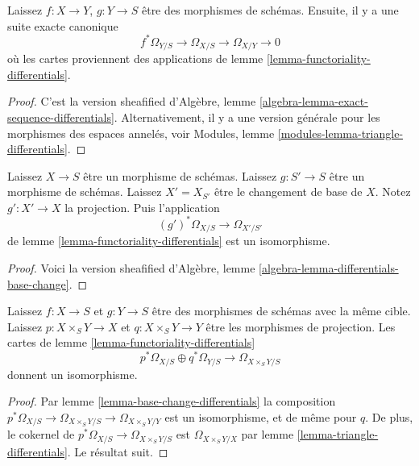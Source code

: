 \begin{lemma}

\label{lemma-triangle-differentials}
Laissez $f : X \to Y$, $g : Y \to S$ être des morphismes de schémas. Ensuite, il y a une suite exacte canonique $$
f^*\Omega_{Y/S} \to \Omega_{X/S} \to \Omega_{X/Y} \to 0
$$ où les cartes proviennent des applications de lemme \ref{lemma-functoriality-differentials}.
\end{lemma}

\begin{proof}
C'est la version sheafified d'Algèbre, lemme \ref{algebra-lemma-exact-sequence-differentials}. Alternativement, il y a une version générale pour les morphismes des espaces annelés, voir Modules, lemme \ref{modules-lemma-triangle-differentials}.
\end{proof}

\begin{lemma}

\label{lemma-base-change-differentials}
Laissez $X \to S$ être un morphisme de schémas. Laissez $g : S' \to S$ être un morphisme de schémas. Laissez $X' = X_{S'}$ être le changement de base de $X$. Notez $g' : X' \to X$ la projection. Puis l'application $$
(g')^*\Omega_{X/S} \to \Omega_{X'/S'}
$$ de lemme \ref{lemma-functoriality-differentials} est un isomorphisme.
\end{lemma}

\begin{proof}
Voici la version sheafified d'Algèbre, lemme \ref{algebra-lemma-differentials-base-change}.
\end{proof}

\begin{lemma}

\label{lemma-differential-product}
Laissez $f : X \to S$ et $g : Y \to S$ être des morphismes de schémas avec la même cible. Laissez $p : X \times_S Y \to X$ et $q : X \times_S Y \to Y$ être les morphismes de projection. Les cartes de lemme \ref{lemma-functoriality-differentials} $$
p^*\Omega_{X/S} \oplus q^*\Omega_{Y/S}
\longrightarrow
\Omega_{X \times_S Y/S}
$$ donnent un isomorphisme.
\end{lemma}

\begin{proof}
Par lemme \ref{lemma-base-change-differentials} la composition $p^*\Omega_{X/S} \to \Omega_{X \times_S Y/S} \to \Omega_{X \times_S Y/Y}$ est un isomorphisme, et de même pour $q$. De plus, le cokernel de $p^*\Omega_{X/S} \to \Omega_{X \times_S Y/S}$ est $\Omega_{X \times_S Y/X}$ par lemme \ref{lemma-triangle-differentials}. Le résultat suit.
\end{proof}

